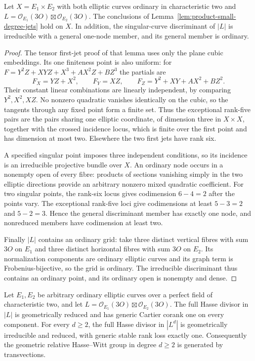 \begin{lemma}
\label{lem:ordinary-product-uniform-jets}
Let $X=E_1\times E_2$ with both elliptic curves ordinary in
characteristic two and $L=\mathcal O_{E_1}(3O)\boxtimes
\mathcal O_{E_2}(3O)$. The conclusions of
Lemma~\ref{lem:product-small-degree-jets} hold on $X$.
In addition, the singular-curve discriminant of $|L|$ is
irreducible with a general one-node member, and its general
member is ordinary.
\end{lemma}

\begin{proof}
The tensor first-jet proof of that lemma uses only the plane
cubic embeddings. Its one finiteness point is also uniform:
for $F=Y^2Z+XYZ+X^3+A X^2Z+B Z^3$ the partials are
\[
 F_X=YZ+X^2,\qquad F_Y=XZ,\qquad
 F_Z=Y^2+XY+A X^2+B Z^2.
\]
Their constant linear combinations are linearly independent,
by comparing $Y^2,X^2,XZ$. No nonzero quadratic vanishes
identically on the cubic, so the tangents through any fixed
point form a finite set. Thus the exceptional rank-five pairs
are the pairs sharing one elliptic coordinate, of dimension
three in $X\times X$, together with the crossed incidence
locus, which is finite over the first point and has dimension
at most two. Elsewhere the two first jets have rank six.

A specified singular point imposes three independent conditions,
so its incidence is an irreducible projective bundle over $X$.
An ordinary node occurs in a nonempty open of every fibre:
products of sections vanishing simply in the two elliptic
directions provide an arbitrary nonzero mixed quadratic
coefficient. For two singular points, the rank-six locus gives
codimension $6-4=2$ after the points vary. The exceptional
rank-five loci give codimensions at least $5-3=2$ and $5-2=3$.
Hence the general discriminant member has exactly one node,
and nonreduced members have codimension at least two.

Finally $|L|$ contains an ordinary grid: take three distinct
vertical fibres with sum $3O$ on $E_1$ and three distinct
horizontal fibres with sum $3O$ on $E_2$.
Its normalization components are ordinary elliptic curves and
its graph term is Frobenius-bijective, so the grid is ordinary.
The irreducible discriminant thus contains an ordinary point,
and its ordinary open is nonempty and dense.
\end{proof}

\begin{theorem}
\label{thm:ordinary-products-Hasse-irreducible}
Let $E_1,E_2$ be arbitrary ordinary elliptic curves over a
perfect field of characteristic two, and let
$L=\mathcal O_{E_1}(3O)\boxtimes\mathcal O_{E_2}(3O)$.
The full Hasse divisor in $|L|$ is geometrically reduced and
has generic Cartier corank one on every component.
For every $d\ge2$, the full Hasse divisor in $|L^d|$ is
geometrically irreducible and reduced, with generic stable
rank loss exactly one. Consequently the geometric relative
Hasse--Witt group in degree $d\ge2$ is generated by
transvections.
\end{theorem}


